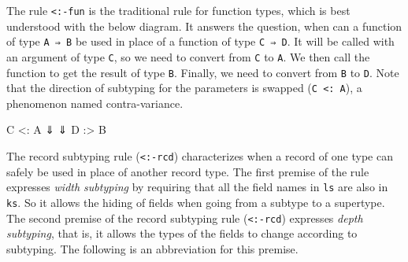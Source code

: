 The rule \texttt{\textless{}:-fun} is the traditional rule for function
types, which is best understood with the below diagram. It answers the
question, when can a function of type \texttt{A\ ⇒\ B} be used in place
of a function of type \texttt{C\ ⇒\ D}. It will be called with an
argument of type \texttt{C}, so we need to convert from \texttt{C} to
\texttt{A}. We then call the function to get the result of type
\texttt{B}. Finally, we need to convert from \texttt{B} to \texttt{D}.
Note that the direction of subtyping for the parameters is swapped
(\texttt{C\ \textless{}:\ A}), a phenomenon named contra-variance.

\begin{myDisplay}
C <: A
⇓    ⇓
D :> B
\end{myDisplay}

The record subtyping rule (\texttt{\textless{}:-rcd}) characterizes when
a record of one type can safely be used in place of another record type.
The first premise of the rule expresses \emph{width subtyping} by
requiring that all the field names in \texttt{ls} are also in
\texttt{ks}. So it allows the hiding of fields when going from a subtype
to a supertype. The second premise of the record subtyping rule
(\texttt{\textless{}:-rcd}) expresses \emph{depth subtyping}, that is,
it allows the types of the fields to change according to subtyping. The
following is an abbreviation for this premise.

